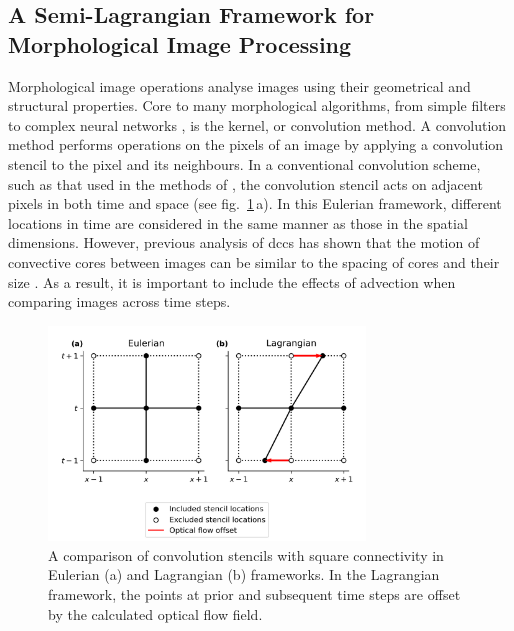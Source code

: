 \subsection{A Semi-Lagrangian Framework for Morphological Image Processing}

Morphological image operations analyse images using their geometrical and structural properties.
Core to many morphological algorithms, from simple filters to complex neural networks \citep{kalchbrenner_convolutional_2014}, is the kernel, or convolution method.
A convolution method performs operations on the pixels of an image by applying a convolution stencil to the pixel and its neighbours.
In a conventional convolution scheme, such as that used in the methods of \citet{fiolleau_algorithm_2013}, the convolution stencil acts on adjacent pixels in both time and space (see fig.~\ref{fig:convolution_kernels}\,a).
In this Eulerian framework, different locations in time are considered in the same manner as those in the spatial dimensions.
However, previous analysis of \acrshort{dcc}s has shown that the motion of convective cores between images can be similar to the spacing of cores and their size \citep{heikenfeld_tobac_2019}.
As a result, it is important to include the effects of advection when comparing images across time steps.


\begin{figure}[tp]
    \includegraphics[width=0.75\textwidth]{figures/chapter1_15.png}
    \caption[
    A comparison of convolution stencils with square connectivity in Eulerian and Lagrangian frameworks.
    ]{
    A comparison of convolution stencils with square connectivity in Eulerian (a) and Lagrangian (b) frameworks. In the Lagrangian framework, the points at prior and subsequent time steps are offset by the calculated optical flow field.
    }
    \label{fig:convolution_kernels}
\end{figure}


